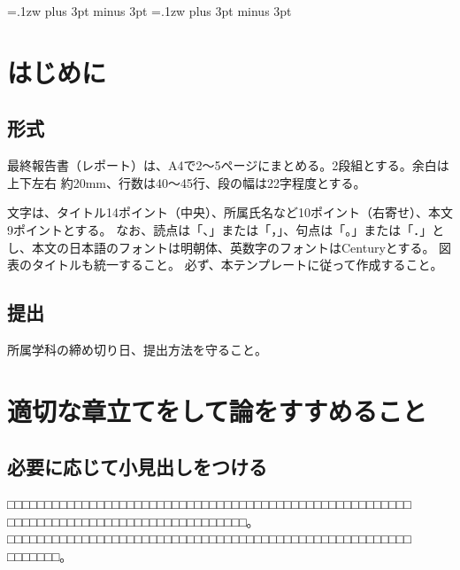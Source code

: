 \documentclass[a4paper,9pt,twocolumn,dvipdfmx]{jarticle}
\begin{document}

\kanjiskip=.1zw plus 3pt minus 3pt
\xkanjiskip=.1zw plus 3pt minus 3pt

\section{はじめに}
\subsection{形式}
最終報告書（レポート）は、A4で2～5ページにまとめる。2段組とする。余白は上下左右 約20mm、行数は40～45行、段の幅は22字程度とする。

文字は、タイトル14ポイント（中央）、所属氏名など10ポイント（右寄せ）、本文9ポイントとする。
なお、読点は「、」または「，」、句点は「。」または「．」とし、本文の日本語のフォントは明朝体、英数字のフォントはCenturyとする。
図表のタイトルも統一すること。
必ず、本テンプレートに従って作成すること。

\subsection{提出}
所属学科の締め切り日、提出方法を守ること。

\section{適切な章立てをして論をすすめること}
\subsection{必要に応じて小見出しをつける}
□□□□□□□□□□□□□□□□□□□□□□□□□□□□□□□□□□□□□□□□□□□□□□□□□□□□□□
□□□□□□□□□□□□□□□□□□□□□□□□□□□□□□□□。
□□□□□□□□□□□□□□□□□□□□□□□□□□□□□□□□□□□□□□□□□□□□□□□□□□□□□□
□□□□□□□。
\end{document}
